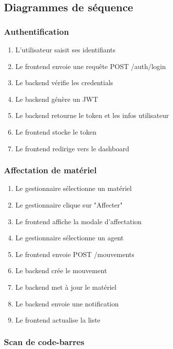 \documentclass[12pt,a4paper]{report}
\begin{document}
\subsection{Diagrammes de séquence}

\subsubsection{Authentification}

\begin{enumerate}
    \item L'utilisateur saisit ses identifiants
    \item Le frontend envoie une requête POST /auth/login
    \item Le backend vérifie les credentials
    \item Le backend génère un JWT
    \item Le backend retourne le token et les infos utilisateur
    \item Le frontend stocke le token
    \item Le frontend redirige vers le dashboard
\end{enumerate}

\subsubsection{Affectation de matériel}

\begin{enumerate}
    \item Le gestionnaire sélectionne un matériel
    \item Le gestionnaire clique sur "Affecter"
    \item Le frontend affiche la modale d'affectation
    \item Le gestionnaire sélectionne un agent
    \item Le frontend envoie POST /mouvements
    \item Le backend crée le mouvement
    \item Le backend met à jour le matériel
    \item Le backend envoie une notification
    \item Le frontend actualise la liste
\end{enumerate}

\subsubsection{Scan de code-barres}
\end{document}
